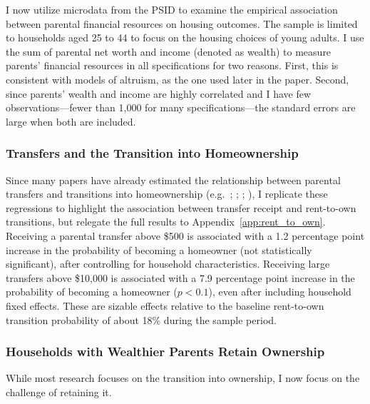 \documentclass[12pt]{article}
\begin{document}
I now utilize microdata from the PSID to examine the empirical association between parental financial resources on housing outcomes. The sample is limited to households aged 25 to 44 to focus on the housing choices of young adults. I use the sum of parental net worth and income (denoted as wealth) to measure parents' financial resources in all specifications for two reasons. First, this is consistent with models of altruism, as the one used later in the paper. Second, since parents' wealth and income are highly correlated and I have few observations---fewer than 1,000 for many specifications---the standard errors are large when both are included.

\subsubsection{Transfers and the Transition into Homeownership}
Since many papers have already estimated the relationship between parental transfers and transitions into homeownership (e.g.\ \citealp{wold2024housing}; \citealp{Blickle2019}; \citealp{benetton2022dynastic}; \citealp{Lee2018}), I replicate these regressions to highlight the association between transfer receipt and rent-to-own transitions, but relegate the full results to Appendix~\ref{app:rent_to_own}. Receiving a parental transfer above \$500 is associated with a 1.2 percentage point increase in the probability of becoming a homeowner (not statistically significant), after controlling for household characteristics. Receiving large transfers above \$10,000 is associated with a 7.9 percentage point increase in the probability of becoming a homeowner ($p<0.1$), even after including household fixed effects. These are sizable effects relative to the baseline rent-to-own transition probability of about 18\% during the sample period.


\subsubsection{Households with Wealthier Parents Retain Ownership}\label{sec:maintaining}
While most research focuses on the transition into ownership, I now focus on the challenge of retaining it.
\end{document}
